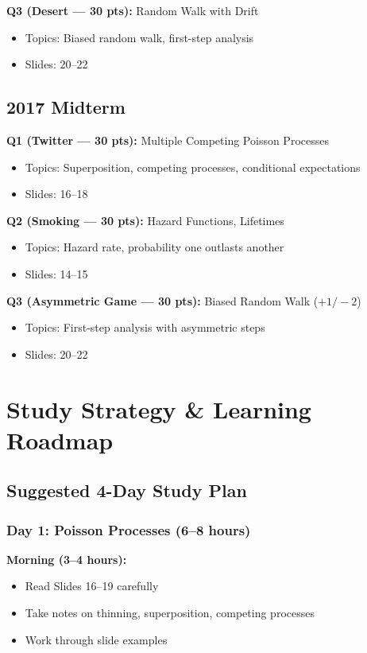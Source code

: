 \documentclass[11pt,letterpaper]{article}
\begin{document}
\textbf{Q3 (Desert --- 30 pts):} Random Walk with Drift
\begin{itemize}
  \item Topics: Biased random walk, first-step analysis
  \item Slides: 20--22
\end{itemize}

\subsection{2017 Midterm}

\textbf{Q1 (Twitter --- 30 pts):} Multiple Competing Poisson Processes
\begin{itemize}
  \item Topics: Superposition, competing processes, conditional expectations
  \item Slides: 16--18
\end{itemize}

\textbf{Q2 (Smoking --- 30 pts):} Hazard Functions, Lifetimes
\begin{itemize}
  \item Topics: Hazard rate, probability one outlasts another
  \item Slides: 14--15
\end{itemize}

\textbf{Q3 (Asymmetric Game --- 30 pts):} Biased Random Walk ($+1/-2$)
\begin{itemize}
  \item Topics: First-step analysis with asymmetric steps
  \item Slides: 20--22
\end{itemize}

\newpage

\section{Study Strategy \& Learning Roadmap}

\subsection{Suggested 4-Day Study Plan}

\subsubsection{Day 1: Poisson Processes (6--8 hours)}

\textbf{Morning (3--4 hours):}
\begin{itemize}[leftmargin=*]
  \item Read Slides 16--19 carefully
  \item Take notes on thinning, superposition, competing processes
  \item Work through slide examples
\end{itemize}
\end{document}

